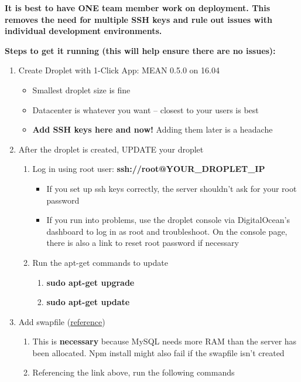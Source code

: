 \documentclass{article}
\begin{document}
\textbf{It is best to have ONE team member work on deployment. This removes the need for multiple SSH keys and rule out issues with individual development environments.}
\begin{flushleft}
\textbf{Steps to get it running (this will help ensure there are no issues):}
\begin{enumerate}
  \item Create Droplet with 1-Click App: MEAN 0.5.0 on 16.04
  \begin{itemize}
    \item Smallest droplet size is fine
    \item Datacenter is whatever you want -- closest to your users is best
    \item \textbf{Add SSH keys here and now!} Adding them later is a headache
  \end{itemize}
  \item After the droplet is created, UPDATE your droplet
  \begin{enumerate}
    \item Log in using root user: \textbf{ssh://root@YOUR\_DROPLET\_IP}
    \begin{itemize}
      \item If you set up ssh keys correctly, the server shouldn't ask for your root password
      \item If you run into problems, use the droplet console via DigitalOcean's dashboard to log in as root and troubleshoot. On the console page, there is also a link to reset root password if necessary
    \end{itemize}
    \item Run the apt-get commands to update
    \begin{enumerate}
      \item \textbf{sudo apt-get upgrade}
      \item \textbf{sudo apt-get update}
    \end{enumerate}
  \end{enumerate}
  \item Add swapfile (\href{https://www.digitalocean.com/community/tutorials/how-to-add-swap-on-ubuntu-14-04}{reference})
  \begin{enumerate}
    \item This is \textbf{necessary} because MySQL needs more RAM than the server has been allocated. Npm install might also fail if the swapfile isn't created
    \item Referencing the link above, run the following commands

\end{enumerate}
\end{enumerate}
\end{flushleft}
\end{document}
